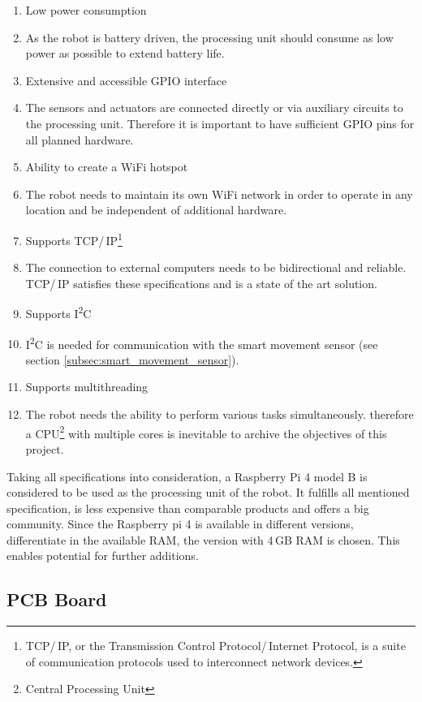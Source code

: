 \begin{enumerate}
\itemsep0em
\item Low power consumption
\item[] As the robot is battery driven, the processing unit should consume as low power as possible to extend battery life.
\item Extensive and accessible GPIO interface
\item[] The sensors and actuators are connected directly or via auxiliary circuits to the processing unit. Therefore it is important to have sufficient GPIO pins for all planned hardware.
\item Ability to create a WiFi hotspot
\item[] The robot needs to maintain its own WiFi network in order to operate in any location and be independent of additional hardware.
\item Supports TCP/\,IP\footnote{TCP/\,IP, or the Transmission Control Protocol/\,Internet Protocol, is a suite of communication protocols used to interconnect network devices.}
\item[] The connection to external computers needs to be bidirectional and reliable. TCP/\,IP satisfies these specifications and is a state of the art solution.
\item Supports I\textsuperscript{2}C
\item[] I\textsuperscript{2}C is needed for communication with the smart movement sensor (see section \ref{subsec:smart_movement_sensor}). 
\item Supports multithreading
\item[] The robot needs the ability to perform various tasks simultaneously. therefore a CPU\footnote{Central Processing Unit} with multiple cores is inevitable to archive the objectives of this project.
\end{enumerate}

Taking all specifications into consideration, a Raspberry Pi 4 model B is considered to be used as the processing unit of the robot. It fulfills all mentioned specification, is less expensive than comparable products and offers a big community. Since the Raspberry pi 4 is available in different versions, differentiate in the available RAM, the version with 4\,GB RAM is chosen. This enables potential for further additions.

\subsection{PCB Board}\label{subsec:pcb_board}


